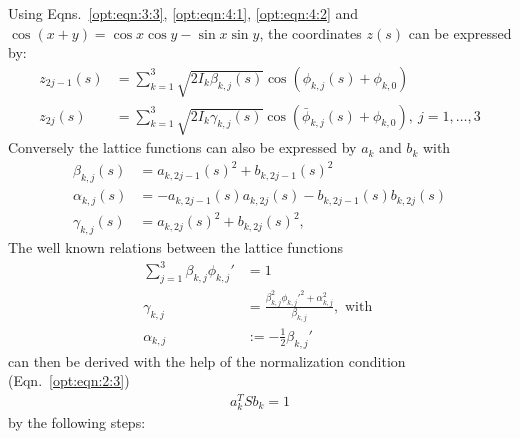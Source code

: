 Using Eqns.~\ref{opt:eqn:3:3}, \ref{opt:eqn:4:1}, \ref{opt:eqn:4:2} and $\cos(x+y)=\cos x\cos y-\sin x\sin y$, the coordinates $z(s)$ can be expressed by:
\begin{align}
z_{2j-1}(s)&=\sum_{k=1}^3 \sqrt{2I_k
\beta_{k,j}(s)}\cos{(\phi_{k,j}(s)+\phi_{k,0})}\\
z_{2j}(s)&=\sum_{k=1}^3 \sqrt{2I_k
\gamma_{k,j}(s)}\cos{(\bar\phi_{k,j}(s)+\phi_{k,0})}, \ j=1,\ldots,3
\end{align}
Conversely the lattice functions can also be expressed by $a_k$ and $b_k$ with
\begin{align}
\beta_{k,j}(s)&=a_{k,2j-1}(s)^2 +b_{k,2j-1}(s)^2 \\
\alpha_{k,j}(s)&=- a_{k,2j-1}(s)a_{k,2j}(s) -b_{k,2j-1}(s)b_{k,2j}(s) \\
\gamma_{k,j}(s)&=a_{k,2j}(s)^2 +b_{k,2j}(s)^2,
\end{align}
The well known relations between the lattice functions
\begin{align}
\sum_{j=1}^3\beta_{k,j}\phi_{k,j}'&=1 \\
\gamma_{k,j}&=\frac{\beta_{k,j}^2\phi_{k,j}'^2+\alpha_{k,j}^2}{\beta_{k,j}}, \text{ with  }\\
\alpha_{k,j}&:=-\frac{1}{2}\beta_{k,j}'
\end{align}
can then be derived with the help of the normalization condition (Eqn.~\ref{opt:eqn:2:3})
\begin{align}
a_k^TSb_k=1
\end{align}
by the following steps:
